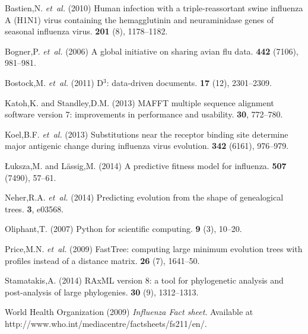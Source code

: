 \documentclass{bioinfo}
\begin{document}
\begin{thebibliography}{}

Bastien,N. {\em et~al.} (2010{\em{}})
  Human infection with a triple-reassortant swine influenza {A (H1N1)} virus
  containing the hemagglutinin and neuraminidase genes of seasonal influenza
  virus.
 {\bf 201} (8), 1178--1182.

Bogner,P. {\em et~al.} (2006{\em{}}) A global
  initiative on sharing avian flu data.
 {\bf 442} (7106), 981--981.

Bostock,M. {\em et~al.} (2011{\em{}}) D$^3$: data-driven
  documents.
 {\bf 17} (12), 2301--2309.

Katoh,K. and Standley,D.M. (2013{\em{}}) {MAFFT} multiple sequence alignment
  software version 7: improvements in performance and usability.
 {\bf 30}, 772--780.

Koel,B.F. {\em et~al.} (2013{\em{}})
  Substitutions near the receptor binding site determine major antigenic change
  during influenza virus evolution.
 {\bf 342} (6161), 976--979.

\L{}uksza,M. and L\"a{}ssig,M. (2014{\em{}}) A predictive fitness model for
  influenza.
 {\bf 507} (7490), 57--61.

Neher,R.A. {\em et~al.} (2014{\em{}}) Predicting evolution
  from the shape of genealogical trees.
 {\bf 3}, e03568.

Oliphant,T. (2007{\em{}}) Python for scientific computing.
 {\bf 9} (3), 10--20.

Price,M.N. {\em et~al.} (2009{\em{}}) {FastTree:} computing
  large minimum evolution trees with profiles instead of a distance matrix.
 {\bf 26} (7), 1641--50.

Stamatakis,A. (2014{\em{}}) {RAxML} version 8: a tool for phylogenetic analysis
  and post-analysis of large phylogenies.
 {\bf 30} (9), 1312--1313.

{World Health Organization} (2009{\em{}}) {\em {Influenza Fact sheet}}.
\newblock Available at http://www.who.int/mediacentre/factsheets/fs211/en/.

\end{thebibliography}
\end{document}
